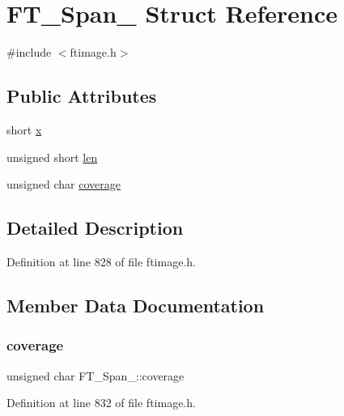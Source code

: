 \hypertarget{struct_f_t___span__}{}\section{F\+T\+\_\+\+Span\+\_\+ Struct Reference}
\label{struct_f_t___span__}


{\ttfamily \#include $<$ftimage.\+h$>$}

\subsection*{Public Attributes}
\begin{DoxyCompactItemize}
\item 
short \mbox{\hyperlink{struct_f_t___span___a7f7235a404c66398b49c50fa09691ba5}{x}}
\item 
unsigned short \mbox{\hyperlink{struct_f_t___span___a939c84317f25a97d0ba01704591a4d38}{len}}
\item 
unsigned char \mbox{\hyperlink{struct_f_t___span___a70f9c9e0e8d3f0b38adee03a508ae214}{coverage}}
\end{DoxyCompactItemize}


\subsection{Detailed Description}


Definition at line 828 of file ftimage.\+h.



\subsection{Member Data Documentation}
\mbox{\label{struct_f_t___span___a70f9c9e0e8d3f0b38adee03a508ae214}} 
\subsubsection{\texorpdfstring{coverage}{coverage}}
{\footnotesize\ttfamily unsigned char F\+T\+\_\+\+Span\+\_\+\+::coverage}



Definition at line 832 of file ftimage.\+h.

\mbox{\label{struct_f_t___span___a939c84317f25a97d0ba01704591a4d38}} 
